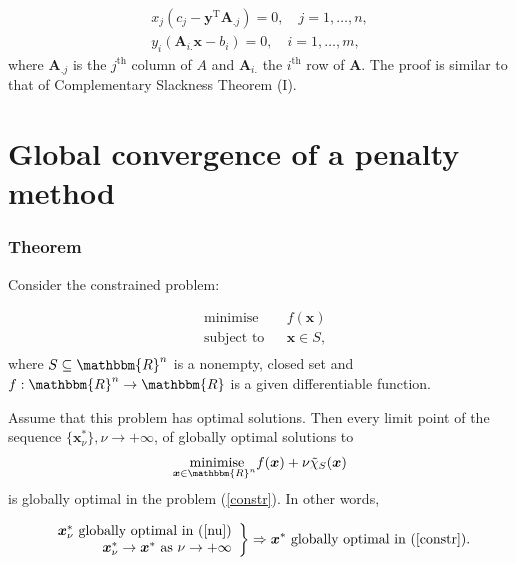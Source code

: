 \documentclass[12pt, a4paper]{article}
\begin{document}
\begin{equation*}
\begin{split}
x_j(c_j - \bm{y}^{\text{T}}\bm{A}_{.j})=0, \quad j=1,\dots,n,\\
y_i(\bm{A}_{i.}\bm{x}-b_i)=0, \quad i=1,\dots,m,
\end{split}
\end{equation*}
where $\bm{A}_{.j}$ is the $j^{\text{th}}$ column of $A$ and $\bm{A}_{i.}$ the $i^{\text{th}}$ row of $\bm{A}$. The proof is similar to that of Complementary Slackness Theorem (I).

\section{Global convergence of a penalty method}
\subsubsection*{Theorem}
Consider the constrained problem:

\begin{equation}
\label{constr}
\begin{aligned}
& {\text{minimise}}
& & f(\bm{x}) \\
& \text{subject to}
& & \bm{x}\in S, \\
\end{aligned}
\end{equation}
where $S\subseteq\mathbbm{R}^n$ is a nonempty, closed set and $f : \mathbbm{R}^n \rightarrow \mathbbm{R}$ is a given differentiable function.

Assume that this problem has optimal solutions. Then every limit point of the sequence $\{\bm{x}^*_{\nu}\}, \nu \rightarrow +\infty$, of globally optimal solutions to 
\begin{equation}
\label{nu}
\begin{aligned}
\underset{\bm{x}\in\mathbbm{R}^n}{\text{ minimise}} f(\bm{x})+\nu \tilde{\chi}_S(\bm{x})
\end{aligned}
\end{equation}
is globally optimal in the problem (\ref{constr}). In other words,

\begin{equation*}
\label{comp}
\left.\begin{array}{r}

  \bm{x}^*_{\nu} \text{ globally optimal in (\ref{nu})} \\
  \bm{x}^*_{\nu} \rightarrow \bm{x}^* \text{ as } \nu \rightarrow +\infty

\end{array}\right\} \Rightarrow \bm{x}^* \text{ globally optimal in (\ref{constr})}.
\end{equation*}
\end{document}

